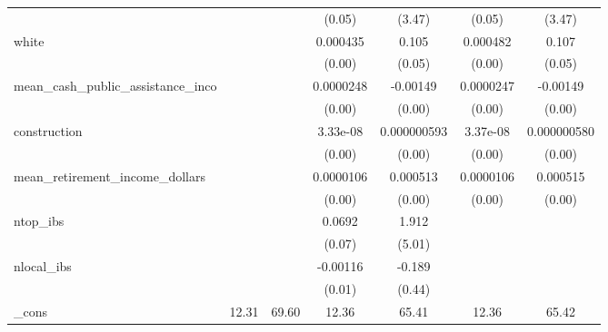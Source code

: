 {\begin{tabular}{l*{6}{c}}
            &                     &                     &      (0.05)         &      (3.47)         &      (0.05)         &      (3.47)         \\
[1em]
white       &                     &                     &    0.000435         &       0.105\sym{*}  &    0.000482         &       0.107\sym{*}  \\
            &                     &                     &      (0.00)         &      (0.05)         &      (0.00)         &      (0.05)         \\
[1em]
mean\_cash\_public\_assistance\_inco&                     &                     &   0.0000248\sym{***}&    -0.00149\sym{***}&   0.0000247\sym{***}&    -0.00149\sym{***}\\
            &                     &                     &      (0.00)         &      (0.00)         &      (0.00)         &      (0.00)         \\
[1em]
construction&                     &                     &    3.33e-08\sym{*}  & 0.000000593         &    3.37e-08\sym{*}  & 0.000000580         \\
            &                     &                     &      (0.00)         &      (0.00)         &      (0.00)         &      (0.00)         \\
[1em]
mean\_retirement\_income\_dollars&                     &                     &   0.0000106\sym{***}&    0.000513\sym{***}&   0.0000106\sym{***}&    0.000515\sym{***}\\
            &                     &                     &      (0.00)         &      (0.00)         &      (0.00)         &      (0.00)         \\
[1em]
ntop\_ibs    &                     &                     &      0.0692         &       1.912         &                     &                     \\
            &                     &                     &      (0.07)         &      (5.01)         &                     &                     \\
[1em]
nlocal\_ibs  &                     &                     &    -0.00116         &      -0.189         &                     &                     \\
            &                     &                     &      (0.01)         &      (0.44)         &                     &                     \\
[1em]
\_cons      &       12.31\sym{***}&       69.60\sym{***}&       12.36\sym{***}&       65.41\sym{***}&       12.36\sym{***}&       65.42\sym{***}\\

\end{tabular}}
